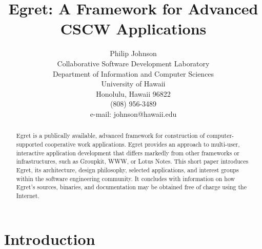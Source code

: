 
\setlength{\textheight}{9.45in}
\setlength{\oddsidemargin}{-0.5in}
\setlength{\evensidemargin}{-0.5in}
\setlength{\topmargin}{-0.49in}
\setlength{\footskip}{0.5in}
\def \columnsep{0.2in}
\def \textwidth{7.45in}




\title{\vspace{-0.75in} Egret: A Framework for Advanced CSCW Applications}

\author{Philip Johnson\\
Collaborative Software Development Laboratory\\
Department of Information and Computer Sciences\\
University of Hawaii\\
Honolulu, Hawaii 96822\\
(808) 956-3489\\
e-mail: johnson@hawaii.edu}



\date{}
\maketitle

\begin {abstract}

{\em 

  Egret is a publically available, advanced framework for construction of
  computer-supported cooperative work applications.  Egret provides an
  approach to multi-user, interactive application development that differs
  markedly from other frameworks or infrastructures, such as Groupkit, WWW,
  or Lotus Notes.  This short paper introduces Egret, its architecture,
  design philosophy, selected applications, and interest groups within the
  software engineering community. It concludes with information on how
  Egret's sources, binaries, and documentation may be obtained free of charge
  using the Internet.

}

\end {abstract}


\section{Introduction}

